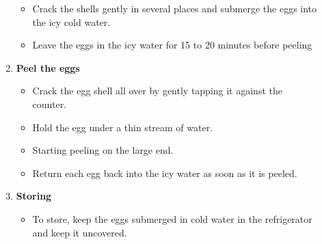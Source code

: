 \documentclass[11pt,letterpaper]{article}
\begin{document}
\begin{description}
\begin{enumerate}
\begin{itemize}
	\item Crack the shells gently in several places and submerge the eggs into the icy cold water.
	\item Leave the eggs in the icy water for 15 to 20 minutes before peeling 
	\end{itemize}
	\item {\bf Peel the eggs}
	\begin{itemize}
	\item Crack the egg shell all over by gently tapping it against the counter.
	\item Hold the egg under a thin stream of water.  
	\item Starting peeling on the large end.
	\item Return each egg back into the icy water as soon as it is peeled.
	\end{itemize}
	\item {\bf Storing}
	\begin{itemize}
	\item To store, keep the eggs submerged in cold water in the refrigerator and keep it uncovered.
	\end{itemize}
	\end{enumerate}
\end{description}
\end{document}

